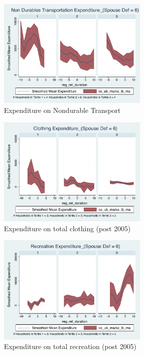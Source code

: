\documentclass[11pt,onecolumn]{article}
\numberwithin{figure}{section}
\begin{document}
\begin{figure}[h]
	\caption{Expenditure on Nondurable Transport}
	\centering
	\includegraphics[width=0.65\textwidth]{../ConsumptionPostRetirement_by_SpouseDef_Cats/Smoothed/6/spouse_def_total_transport_real.pdf}
\end{figure}
\clearpage

\begin{figure}[h]
	\caption{Expenditure on total clothing (post 2005)}
	\centering
	\includegraphics[width=0.65\textwidth]{../ConsumptionPostRetirement_by_SpouseDef_Cats/Smoothed/6/spouse_def_total_clothing_2005_real.pdf}
\end{figure}

\begin{figure}[h]
	\caption{Expenditure on total recreation (post 2005)}
	\centering
	\includegraphics[width=0.65\textwidth]{../ConsumptionPostRetirement_by_SpouseDef_Cats/Smoothed/6/spouse_def_total_recreation_2005_real.pdf}
\end{figure}
\end{document}
